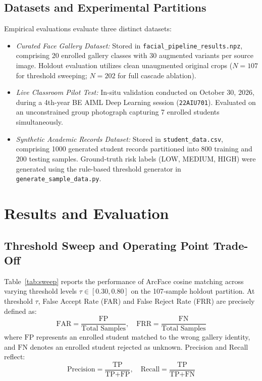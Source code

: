 \documentclass[conference]{IEEEtran}
\begin{document}
\subsection{Datasets and Experimental Partitions}
Empirical evaluations evaluate three distinct datasets:
\begin{itemize}
    \item \textit{Curated Face Gallery Dataset:} Stored in \texttt{facial\_pipeline\_results.npz}, comprising 20 enrolled gallery classes with 30 augmented variants per source image. Holdout evaluation utilizes clean unaugmented original crops ($N=107$ for threshold sweeping; $N=202$ for full cascade ablation).
    \item \textit{Live Classroom Pilot Test:} In-situ validation conducted on October 30, 2026, during a 4th-year BE AIML Deep Learning session (\texttt{22AIU701}). Evaluated on an unconstrained group photograph capturing 7 enrolled students simultaneously.
    \item \textit{Synthetic Academic Records Dataset:} Stored in \texttt{student\_data.csv}, comprising 1000 generated student records partitioned into 800 training and 200 testing samples. Ground-truth risk labels (LOW, MEDIUM, HIGH) were generated using the rule-based threshold generator in \texttt{generate\_sample\_data.py}.
\end{itemize}

\section{Results and Evaluation}

\subsection{Threshold Sweep and Operating Point Trade-Off}
Table~\ref{tab:sweep} reports the performance of ArcFace cosine matching across varying threshold levels $\tau \in [0.30, 0.80]$ on the 107-sample holdout partition. At threshold $\tau$, False Accept Rate (FAR) and False Reject Rate (FRR) are precisely defined as:
\begin{equation}
\text{FAR} = \frac{\text{FP}}{\text{Total Samples}}, \quad \text{FRR} = \frac{\text{FN}}{\text{Total Samples}}
\end{equation}
where $\text{FP}$ represents an enrolled student matched to the wrong gallery identity, and $\text{FN}$ denotes an enrolled student rejected as unknown. Precision and Recall reflect:
\begin{equation}
\text{Precision} = \frac{\text{TP}}{\text{TP} + \text{FP}}, \quad \text{Recall} = \frac{\text{TP}}{\text{TP} + \text{FN}}
\end{equation}
\end{document}
